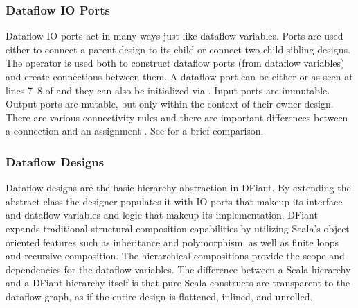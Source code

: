 \subsubsection{Dataflow IO Ports} 
\label{sec:io_ports}
Dataflow IO ports act in many ways just like dataflow variables. 
Ports are used either to connect a parent design to its child or connect two child sibling designs. The operator \code{<>} is used both to construct dataflow ports (from dataflow variables) and create connections between them. 
A dataflow port can be either  or  as seen at lines 7--8 of  and they can also be initialized via . Input ports are immutable. Output ports are mutable, but only within the context of their owner design.  
There are various connectivity rules and there are important differences between a connection \code{<>} and an assignment \code{:=}. See  for a brief comparison.

\subsubsection{Dataflow Designs} 
Dataflow designs are the basic hierarchy abstraction in DFiant. By extending the abstract class  the designer populates it with IO ports that makeup its interface and dataflow variables and logic that makeup its implementation.
DFiant expands traditional structural composition capabilities by utilizing Scala's object oriented features such as inheritance and polymorphism, as well as finite loops and recursive composition. The hierarchical compositions provide the scope and dependencies for the dataflow variables. The difference between a Scala hierarchy and a DFiant hierarchy itself is that pure Scala constructs are transparent to the dataflow graph, as if the entire design is flattened, inlined, and unrolled. 



